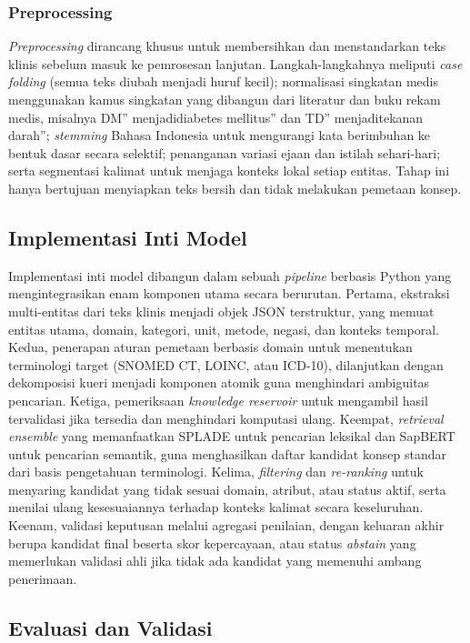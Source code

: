\subsubsection{Preprocessing}

\textit{Preprocessing} dirancang khusus untuk membersihkan dan menstandarkan teks klinis sebelum masuk ke pemrosesan lanjutan. Langkah-langkahnya meliputi \textit{case folding} (semua teks diubah menjadi huruf kecil); normalisasi singkatan medis menggunakan kamus singkatan yang dibangun dari literatur dan buku rekam medis, misalnya DM'' menjadidiabetes mellitus'' dan TD'' menjaditekanan darah''; \textit{stemming} Bahasa Indonesia untuk mengurangi kata berimbuhan ke bentuk dasar secara selektif; penanganan variasi ejaan dan istilah sehari-hari; serta segmentasi kalimat untuk menjaga konteks lokal setiap entitas. Tahap ini hanya bertujuan menyiapkan teks bersih dan tidak melakukan pemetaan konsep.

\subsection{Implementasi Inti Model}

Implementasi inti model dibangun dalam sebuah \textit{pipeline} berbasis Python yang mengintegrasikan enam komponen utama secara berurutan. Pertama, ekstraksi multi-entitas dari teks klinis menjadi objek JSON terstruktur, yang memuat entitas utama, domain, kategori, unit, metode, negasi, dan konteks temporal. Kedua, penerapan aturan pemetaan berbasis domain untuk menentukan terminologi target (SNOMED CT, LOINC, atau ICD-10), dilanjutkan dengan dekomposisi kueri menjadi komponen atomik guna menghindari ambiguitas pencarian. Ketiga, pemeriksaan \textit{knowledge reservoir} untuk mengambil hasil tervalidasi jika tersedia dan menghindari komputasi ulang. Keempat, \textit{retrieval ensemble} yang memanfaatkan SPLADE untuk pencarian leksikal dan SapBERT untuk pencarian semantik, guna menghasilkan daftar kandidat konsep standar dari basis pengetahuan terminologi. Kelima, \textit{filtering} dan \textit{re-ranking} untuk menyaring kandidat yang tidak sesuai domain, atribut, atau status aktif, serta menilai ulang kesesuaiannya terhadap konteks kalimat secara keseluruhan. Keenam, validasi keputusan melalui agregasi penilaian, dengan keluaran akhir berupa kandidat final beserta skor kepercayaan, atau status \textit{abstain} yang memerlukan validasi ahli jika tidak ada kandidat yang memenuhi ambang penerimaan.

\subsection{Evaluasi dan Validasi}

